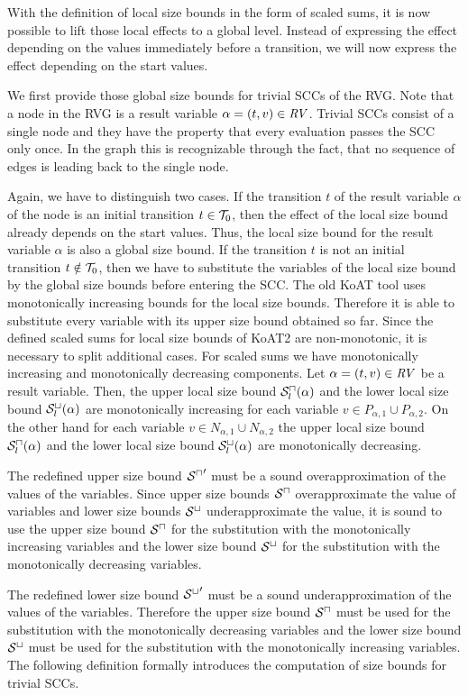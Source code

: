 With the definition of local size bounds in the form of scaled sums, it is now possible to lift those local effects to a global level.
Instead of expressing the effect depending on the values immediately before a transition, we will now express the effect depending on the start values.

We first provide those global size bounds for trivial SCCs of the RVG.
Note that a node in the RVG is a result variable $\alpha = (t,v) \in \mathit{RV}$.
Trivial SCCs consist of a single node and they have the property that every evaluation passes the SCC only once.
In the graph this is recognizable through the fact, that no sequence of edges is leading back to the single node.

Again, we have to distinguish two cases.
If the transition $t$ of the result variable $\alpha$ of the node is an initial transition $t \in \mathcal{T}_0$, then the effect of the local size bound already depends on the start values.
Thus, the local size bound for the result variable $\alpha$ is also a global size bound.
If the transition $t$ is not an initial transition $t \notin \mathcal{T}_0$, then we have to substitute the variables of the local size bound by the global size bounds before entering the SCC.
The old KoAT tool uses monotonically increasing bounds for the local size bounds.
Therefore it is able to substitute every variable with its upper size bound obtained so far.
Since the defined scaled sums for local size bounds of KoAT2 are non-monotonic, it is necessary to split additional cases.
For scaled sums we have monotonically increasing and monotonically decreasing components.
Let $\alpha = (t,v) \in \mathit{RV}$ be a result variable.
Then, the upper local size bound ${\mathcal{S}^\sqcap_l}(\alpha)$ and the lower local size bound ${\mathcal{S}^\sqcup_l}(\alpha)$ are monotonically increasing for each variable $v \in P_{\alpha,1} \cup P_{\alpha,2}$.
On the other hand for each variable $v \in N_{\alpha,1} \cup N_{\alpha,2}$ the upper local size bound ${\mathcal{S}^\sqcap_l}(\alpha)$ and the lower local size bound ${\mathcal{S}^\sqcup_l}(\alpha)$ are monotonically decreasing.

The redefined upper size bound ${{\mathcal{S}^\sqcap}}'$ must be a sound overapproximation of the values of the variables.
Since upper size bounds ${\mathcal{S}^\sqcap}$ overapproximate the value of variables and lower size bounds ${\mathcal{S}^\sqcup}$ underapproximate the value, it is sound to use the upper size bound ${\mathcal{S}^\sqcap}$ for the substitution with the monotonically increasing variables and the lower size bound ${\mathcal{S}^\sqcup}$ for the substitution with the monotonically decreasing variables.

The redefined lower size bound ${{\mathcal{S}^\sqcup}}'$ must be a sound underapproximation of the values of the variables.
Therefore the upper size bound ${\mathcal{S}^\sqcap}$ must be used for the substitution with the monotonically decreasing variables and the lower size bound ${\mathcal{S}^\sqcup}$ must be used for the substitution with the monotonically increasing variables.
The following definition formally introduces the computation of size bounds for trivial SCCs.

